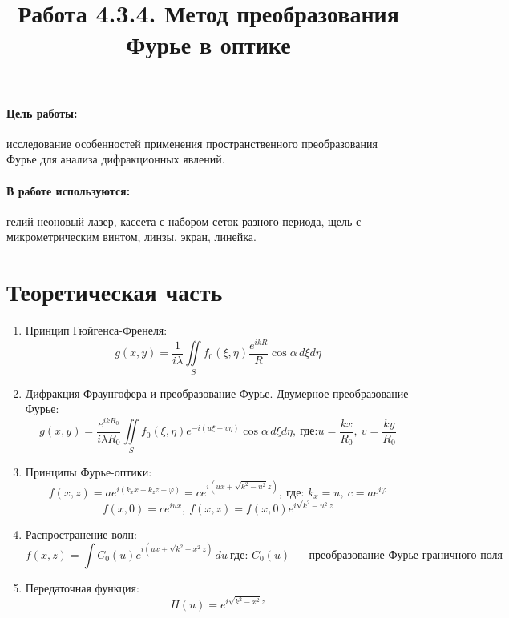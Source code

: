 \documentclass[12pt]{article}
\title{Работа 4.3.4. Метод преобразования Фурье в оптике}
\date{}
\begin{document}
\maketitle

\paragraph{Цель работы:}исследование особенностей применения пространственного преобразования Фурье для анализа дифракционных явлений.

\paragraph{В работе используются:}гелий-неоновый лазер, кассета с набором сеток разного периода, щель с микрометрическим винтом, линзы, экран, линейка.

\section*{Теоретическая часть}
\begin{enumerate}
    \item Принцип Гюйгенса-Френеля:
    \[ g(x,y) = \frac{1}{i \lambda} \iint\limits_S f_0(\xi,\eta ) \frac{e^{ikR}}{R}\cos{\alpha} \,d\xi d\eta  \] 
    
    \item Дифракция Фраунгофера и преобразование Фурье. Двумерное преобразование Фурье:
    \[ g(x,y) = \frac{e^{ikR_0}}{i \lambda R_0} \iint\limits_S f_0(\xi,\eta ) e^{-i(u\xi + v\eta)} \cos{\alpha} \,d\xi d\eta,\  \text{где:} u = \frac{kx}{R_0},\ v = \frac{ky}{R_0}  \] 
    
    \item Принципы Фурье-оптики:
    \[ f(x,z) = a e^{i(k_x x+k_z z + \varphi)} = c e^{i(ux + \sqrt{k^2 - u^2} z )},\ \text{где: } k_x = u,\ c = a e^{i \varphi}  \] 
    \[ f(x,0) = c e^{iux},\ f(x,z) = f(x,0) e^{i \sqrt{k^2-u^2}z } \]
    \item Распространение волн:
    \[ f(x,z)= \int C_0(u) e^{i(ux+\sqrt{k^2-x^2}z) } \,du\ \text{где: }C_0(u) \text{ --- преобразование Фурье граничного поля} \]
    \item Передаточная функция:
    \[ H(u) = e^{i\sqrt{k^2-x^2}z} \]
    
\end{enumerate}
\end{document}
